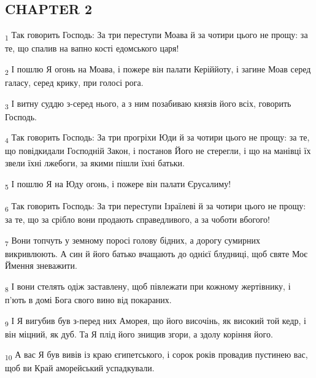\subsection{CHAPTER 2}
\begin{tcolorbox}
\textsubscript{1} Так говорить Господь: За три переступи Моава й за чотири цього не прощу: за те, що спалив на вапно кості едомського царя!
\end{tcolorbox}
\begin{tcolorbox}
\textsubscript{2} І пошлю Я огонь на Моава, і пожере він палати Керіййоту, і загине Моав серед галасу, серед крику, при голосі рога.
\end{tcolorbox}
\begin{tcolorbox}
\textsubscript{3} І витну суддю з-серед нього, а з ним позабиваю князів його всіх, говорить Господь.
\end{tcolorbox}
\begin{tcolorbox}
\textsubscript{4} Так говорить Господь: За три прогріхи Юди й за чотири цього не прощу: за те, що повідкидали Господній Закон, і постанов Його не стерегли, і що на манівці їх звели їхні лжебоги, за якими пішли їхні батьки.
\end{tcolorbox}
\begin{tcolorbox}
\textsubscript{5} І пошлю Я на Юду огонь, і пожере він палати Єрусалиму!
\end{tcolorbox}
\begin{tcolorbox}
\textsubscript{6} Так говорить Господь: За три переступи Ізраїлеві й за чотири цього не прощу: за те, що за срібло вони продають справедливого, а за чоботи вбогого!
\end{tcolorbox}
\begin{tcolorbox}
\textsubscript{7} Вони топчуть у земному поросі голову бідних, а дорогу сумирних викривлюють. А син й його батько вчащають до однієї блудниці, щоб святе Моє Ймення зневажити.
\end{tcolorbox}
\begin{tcolorbox}
\textsubscript{8} І вони стелять одіж заставлену, щоб півлежати при кожному жертівнику, і п'ють в домі Бога свого вино від покараних.
\end{tcolorbox}
\begin{tcolorbox}
\textsubscript{9} І Я вигубив був з-перед них Аморея, що його височінь, як високий той кедр, і він міцний, як дуб. Та Я плід його знищив згори, а здолу коріння його.
\end{tcolorbox}
\begin{tcolorbox}
\textsubscript{10} А вас Я був вивів із краю єгипетського, і сорок років провадив пустинею вас, щоб ви Край аморейський успадкували.
\end{tcolorbox}
